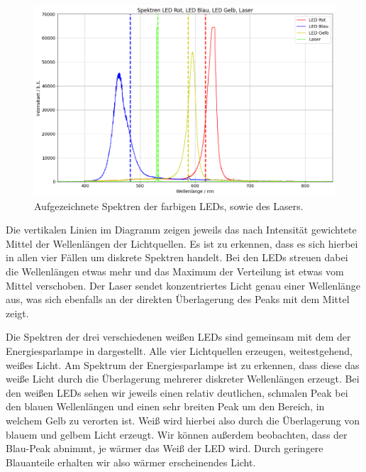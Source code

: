 \begin{figure}[H]
  \centering
  \includegraphics[width=.9\textwidth]{files/plots/led_vergleich.png}
  \caption{Aufgezeichnete Spektren der farbigen LEDs, sowie des Lasers.}
  \label{fig:led_vergleich}
\end{figure}

Die vertikalen Linien im Diagramm zeigen jeweils das nach Intensität gewichtete Mittel der Wellenlängen der Lichtquellen. Es ist zu erkennen, dass es sich hierbei in allen vier Fällen um diskrete Spektren handelt. Bei den LEDs streuen dabei die Wellenlängen etwas mehr und das Maximum der Verteilung ist etwas vom Mittel verschoben. Der Laser sendet konzentriertes Licht genau einer Wellenlänge aus, was sich ebenfalls an der direkten Überlagerung des \glqq{}Peaks\grqq{} mit dem Mittel zeigt.

Die Spektren der drei verschiedenen weißen LEDs sind gemeinsam mit dem der Energiesparlampe in  dargestellt. Alle vier Lichtquellen erzeugen, weitestgehend, weißes Licht. Am Spektrum der Energiesparlampe ist zu erkennen, dass diese das weiße Licht durch die Überlagerung mehrerer diskreter Wellenlängen erzeugt. Bei den weißen LEDs sehen wir jeweils einen relativ deutlichen, schmalen Peak bei den \glqq{}blauen\grqq{} Wellenlängen und einen sehr breiten Peak um den Bereich, in welchem Gelb zu verorten ist. Weiß wird hierbei also durch die Überlagerung von blauem und gelbem Licht erzeugt. Wir können außerdem beobachten, dass der Blau-Peak abnimmt, je \glqq{}wärmer\grqq{} das Weiß der LED wird. Durch geringere Blauanteile erhalten wir also wärmer erscheinendes Licht.

